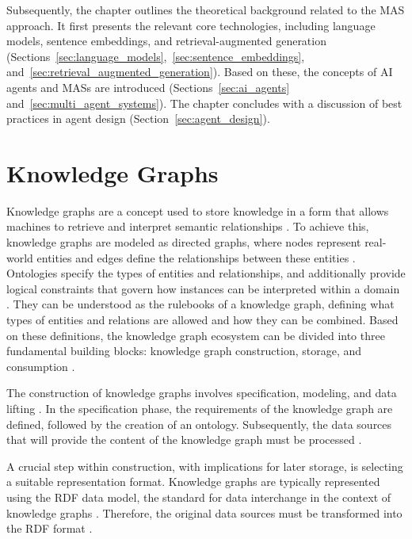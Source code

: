 \documentclass[a4paper,oneside,bibliography=totoc]{scrbook}
\begin{document}
Subsequently, the chapter outlines the theoretical background related to the \ac{MAS} approach. It first presents the relevant core technologies, including language models, sentence embeddings, and retrieval-augmented generation (Sections~\ref{sec:language_models},~\ref{sec:sentence_embeddings}, and~\ref{sec:retrieval_augmented_generation}). Based on these, the concepts of \ac{AI} agents and \acp{MAS} are introduced (Sections~\ref{sec:ai_agents} and~\ref{sec:multi_agent_systems}). The chapter concludes with a discussion of best practices in agent design (Section~\ref{sec:agent_design}).


\section{Knowledge Graphs}
\label{sec:knowledge_graphs}

Knowledge graphs are a concept used to store knowledge in a form that allows machines to retrieve and interpret semantic relationships \cite{GomezPerez2017}. To achieve this, knowledge graphs are modeled as directed graphs, where nodes represent real-world entities and edges define the relationships between these entities \cite{Paulheim2016}. Ontologies specify the types of entities and relationships, and additionally provide logical constraints that govern how instances can be interpreted within a domain \cite{GomezPerez2017,Paulheim2016}. They can be understood as the rulebooks of a knowledge graph, defining what types of entities and relations are allowed and how they can be combined. Based on these definitions, the knowledge graph ecosystem can be divided into three fundamental building blocks: knowledge graph construction, storage, and consumption \cite{GomezPerez2017}.

The construction of knowledge graphs involves specification, modeling, and data lifting \cite{VillazonTerrazas2017}. In the specification phase, the requirements of the knowledge graph are defined, followed by the creation of an ontology. Subsequently, the data sources that will provide the content of the knowledge graph must be processed \cite{VillazonTerrazas2017}.

A crucial step within construction, with implications for later storage, is selecting a suitable representation format. Knowledge graphs are typically represented using the \ac{RDF} data model, the standard for data interchange in the context of knowledge graphs \cite{VillazonTerrazas2017a}. Therefore, the original data sources must be transformed into the \ac{RDF} format \cite{VillazonTerrazas2017a}.
\end{document}
